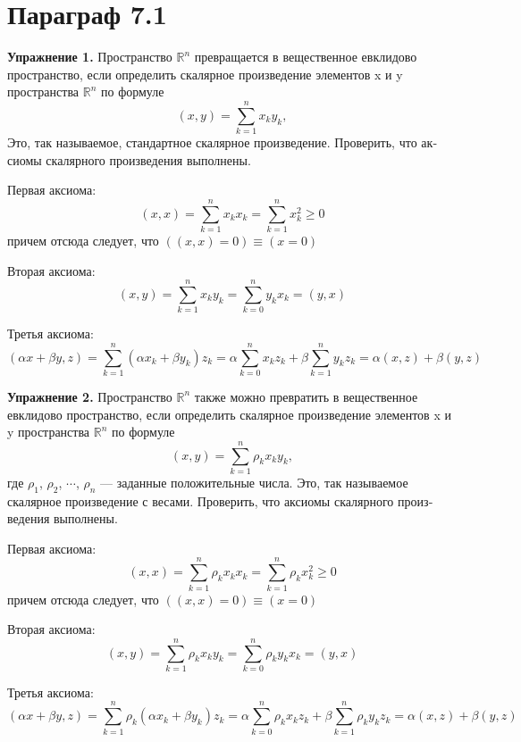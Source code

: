 \section*{Параграф 7.1}
\large{\bf{Упражнение 1.}} Пространство $\mathbb{R}^n$ превращается в вещественное евкли­дово пространство, 
если определить скалярное произведение элементов x и y
пространства $\mathbb{R}^n$ по формуле $$ (x, y) = \sum_{k = 1}^{n} x_k y_k, $$ 
Это, так называемое, стандартное скалярное произведение. Проверить, что ак­сиомы скалярного произведения выполнены.
\begin{solution}
    Первая аксиома: $$ (x, x) = \sum_{k = 1}^{n} x_k x_k = \sum_{k = 1}^{n} x_k^2 \geq 0 $$
    причем отсюда следует, что $ ((x, x) = 0) \equiv (x = 0) $ \par
    Вторая аксиома: $$ (x, y) = \sum_{k = 1}^{n} x_k y_k = \sum_{k = 0}^{n} y_k x_k = (y, x) $$ \par
    Третья аксиома: $$ (\alpha x + \beta y, z) = \sum_{k = 1}^{n} (\alpha x_k + \beta y_k) z_k = \alpha \sum_{k = 0}^{n} x_k z_k + \beta \sum_{k = 1}^{n} y_k z_k = \alpha (x, z) + \beta (y, z) $$ \par
\end{solution}

\large{\bf{Упражнение 2.}} Пространство $ \mathbb{R}^n $ также можно 
превратить в веще­ственное евклидово пространство, 
если определить скалярное произведение элементов x и y 
пространства $ \mathbb{R}^n $ по формуле $$ (x, y) = \sum_{k = 1}^{n} \rho_k x_k y_k, $$ 
где $\rho_1$, $\rho_2$, $\cdots$, $\rho_n$ — заданные положительные числа. Это, так называемое
скалярное произведение с весами. Проверить, что аксиомы скалярного произ­
ведения выполнены.
\begin{solution}
    Первая аксиома: $$ (x, x) = \sum_{k = 1}^{n} \rho_k x_k x_k = \sum_{k = 1}^{n} \rho_k x_k^2 \geq 0 $$
    причем отсюда следует, что $ ((x, x) = 0) \equiv (x = 0) $ \par
    Вторая аксиома: $$ (x, y) = \sum_{k = 1}^{n} \rho_k x_k y_k = \sum_{k = 0}^{n} \rho_k y_k x_k = (y, x) $$ \par
    Третья аксиома: $$ (\alpha x + \beta y, z) = \sum_{k = 1}^{n} \rho_k (\alpha x_k + \beta y_k) z_k = \alpha \sum_{k = 0}^{n} \rho_k x_k z_k + \beta \sum_{k = 1}^{n} \rho_k y_k z_k = \alpha (x, z) + \beta (y, z) $$ \par
\end{solution} 


